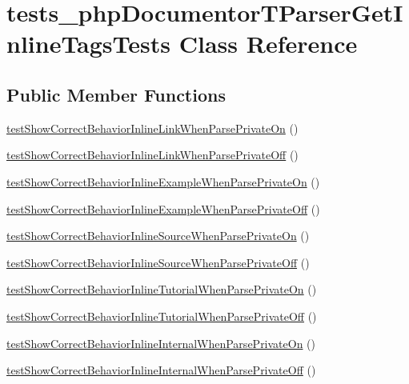 \hypertarget{classtests__php_documentor_t_parser_get_inline_tags_tests}{\section{tests\-\_\-php\-Documentor\-T\-Parser\-Get\-Inline\-Tags\-Tests \-Class \-Reference}
\label{classtests__php_documentor_t_parser_get_inline_tags_tests}
}
\subsection*{\-Public \-Member \-Functions}
\begin{DoxyCompactItemize}
\item 
\hyperlink{classtests__php_documentor_t_parser_get_inline_tags_tests_acfb8f14f3dedaba11ec8c7552065dba6}{test\-Show\-Correct\-Behavior\-Inline\-Link\-When\-Parse\-Private\-On} ()
\item 
\hyperlink{classtests__php_documentor_t_parser_get_inline_tags_tests_a03dc6f1673d7df39b97e6ace6cef9a5b}{test\-Show\-Correct\-Behavior\-Inline\-Link\-When\-Parse\-Private\-Off} ()
\item 
\hyperlink{classtests__php_documentor_t_parser_get_inline_tags_tests_a59f101202ac43701234cf5f53d9a87df}{test\-Show\-Correct\-Behavior\-Inline\-Example\-When\-Parse\-Private\-On} ()
\item 
\hyperlink{classtests__php_documentor_t_parser_get_inline_tags_tests_aa3cee65ed2ae6e54b1fe9129cbb469b5}{test\-Show\-Correct\-Behavior\-Inline\-Example\-When\-Parse\-Private\-Off} ()
\item 
\hyperlink{classtests__php_documentor_t_parser_get_inline_tags_tests_a58319bb42caedd8ff3b2ae673f705a32}{test\-Show\-Correct\-Behavior\-Inline\-Source\-When\-Parse\-Private\-On} ()
\item 
\hyperlink{classtests__php_documentor_t_parser_get_inline_tags_tests_a2c64d1d17058bd2042afd24b456f2611}{test\-Show\-Correct\-Behavior\-Inline\-Source\-When\-Parse\-Private\-Off} ()
\item 
\hyperlink{classtests__php_documentor_t_parser_get_inline_tags_tests_aeac14b8c6c751699bff48d10d65e791c}{test\-Show\-Correct\-Behavior\-Inline\-Tutorial\-When\-Parse\-Private\-On} ()
\item 
\hyperlink{classtests__php_documentor_t_parser_get_inline_tags_tests_a8f39adeba850a0bf2cc8dcd7a0c36df7}{test\-Show\-Correct\-Behavior\-Inline\-Tutorial\-When\-Parse\-Private\-Off} ()
\item 
\hyperlink{classtests__php_documentor_t_parser_get_inline_tags_tests_ad5f173df611142bc8d2f35d3beec2350}{test\-Show\-Correct\-Behavior\-Inline\-Internal\-When\-Parse\-Private\-On} ()
\item 
\hyperlink{classtests__php_documentor_t_parser_get_inline_tags_tests_aa54bba226d0bc02228fd001057689f43}{test\-Show\-Correct\-Behavior\-Inline\-Internal\-When\-Parse\-Private\-Off} ()
\end{DoxyCompactItemize}
